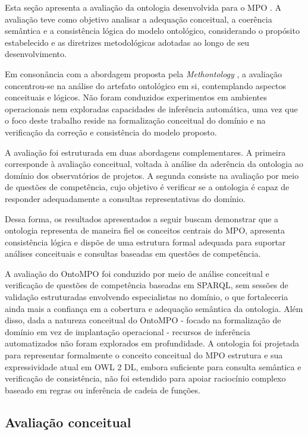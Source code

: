 Esta seção apresenta a avaliação da ontologia desenvolvida para o MPO \cite{vieira2022thesis}. A avaliação teve como objetivo analisar a adequação conceitual, a coerência semântica e a consistência lógica do modelo ontológico, considerando o propósito estabelecido e as diretrizes metodológicas adotadas ao longo de seu desenvolvimento.

Em consonância com a abordagem proposta pela \textit{Methontology} \cite{fernandez1997methontology}, a avaliação concentrou-se na análise do artefato ontológico em si, contemplando aspectos conceituais e lógicos. Não foram conduzidos experimentos em ambientes operacionais nem exploradas capacidades de inferência automática, uma vez que o foco deste trabalho reside na formalização conceitual do domínio e na verificação da correção e consistência do modelo proposto.

A avaliação foi estruturada em duas abordagens complementares. A primeira corresponde à avaliação conceitual, voltada à análise da aderência da ontologia ao domínio dos observatórios de projetos. A segunda consiste na avaliação por meio de questões de competência, cujo objetivo é verificar se a ontologia é capaz de responder adequadamente a consultas representativas do domínio.

Dessa forma, os resultados apresentados a seguir buscam demonstrar que a ontologia representa de maneira fiel os conceitos centrais do MPO, apresenta consistência lógica e dispõe de uma estrutura formal adequada para suportar análises conceituais e consultas baseadas em questões de competência.

A avaliação do OntoMPO foi
conduzido por meio de análise conceitual e verificação de questões de competência baseadas em SPARQL, sem
sessões de validação estruturadas envolvendo especialistas no domínio, o que fortaleceria ainda mais a confiança em
a cobertura e adequação semântica da ontologia. Além disso, dada a natureza conceitual do OntoMPO -
focado na formalização de domínio em vez de implantação operacional - recursos de inferência automatizados
não foram explorados em profundidade. A ontologia foi projetada para representar formalmente o conceito conceitual do MPO
estrutura e sua expressividade atual em OWL 2 DL, embora suficiente para consulta semântica e
verificação de consistência, não foi estendido para apoiar raciocínio complexo baseado em regras ou inferência de cadeia de funções.

\subsection{Avaliação conceitual}

